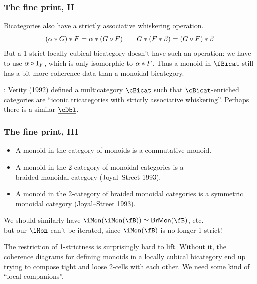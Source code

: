 \documentclass{beamer}
\def\ubicat{\underline{\cBicat}}
\begin{document}
\begin{frame}
  \frametitle{The fine print, II}
  Bicategories also have a strictly associative \alert{whiskering} operation.
  \[ (\alpha \ast G)\ast F = \alpha\ast (G\circ F) \qquad G\ast (F\ast \beta) = (G\circ F) \ast \beta \]
  But a 1-strict locally cubical bicategory doesn't have such an operation: we have to use $\alpha \circ 1_F$, which is only \alert{isomorphic} to $\alpha \ast F$.
  Thus a monoid in $\fBicat$ still has a bit more coherence data than a monoidal bicategory.

  \bigskip
  : Verity (1992) defined a \alert{multicategory} $\ubicat$ such that $\ubicat$-enriched categories are ``iconic tricategories with strictly associative whiskering''.
  Perhaps there is a similar $\underline{\cDbl}$.
\end{frame}

\begin{frame}
  \frametitle{The fine print, III}
  \begin{itemize}
  \item A monoid in the category of monoids is a commutative monoid.
  \item A monoid in the 2-category of monoidal categories is a\\ braided monoidal category (Joyal--Street 1993).
  \item A monoid in the 2-category of braided monoidal categories is a symmetric monoidal category (Joyal--Street 1993).
  \end{itemize}
  We should similarly have $\iMon(\iMon(\fB)) \simeq \mathsf{BrMon}(\fB)$, etc. ---\\
  but our $\iMon$ can't be iterated, since $\iMon(\fB)$ is no longer 1-strict!

  \bigskip
  The restriction of 1-strictness is surprisingly hard to lift.
  Without it, the coherence diagrams for defining monoids in a locally cubical bicategory end up trying to compose tight and loose 2-cells with each other.
  We need some kind of ``local companions''.
\end{frame}
\end{document}
